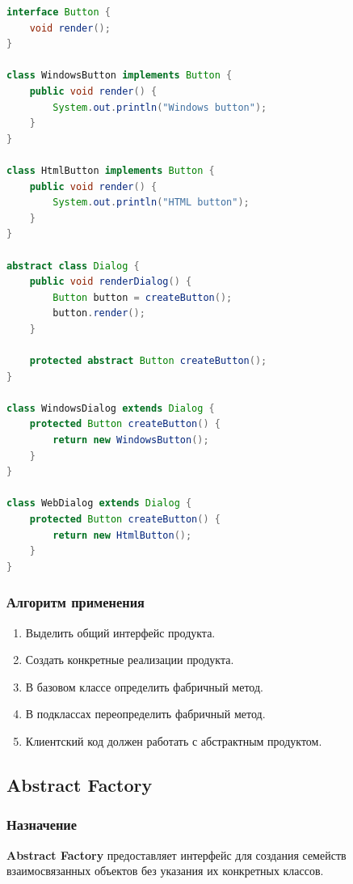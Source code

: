 \documentclass[12pt,a4paper]{article}
\begin{document}
\begin{lstlisting}[language=Java,caption={Factory Method}]
interface Button {
    void render();
}

class WindowsButton implements Button {
    public void render() {
        System.out.println("Windows button");
    }
}

class HtmlButton implements Button {
    public void render() {
        System.out.println("HTML button");
    }
}

abstract class Dialog {
    public void renderDialog() {
        Button button = createButton();
        button.render();
    }

    protected abstract Button createButton();
}

class WindowsDialog extends Dialog {
    protected Button createButton() {
        return new WindowsButton();
    }
}

class WebDialog extends Dialog {
    protected Button createButton() {
        return new HtmlButton();
    }
}
\end{lstlisting}

\subsubsection{Алгоритм применения}

\begin{enumerate}
    \item Выделить общий интерфейс продукта.
    \item Создать конкретные реализации продукта.
    \item В базовом классе определить фабричный метод.
    \item В подклассах переопределить фабричный метод.
    \item Клиентский код должен работать с абстрактным продуктом.
\end{enumerate}

\subsection{Abstract Factory}

\subsubsection{Назначение}

\textbf{Abstract Factory} предоставляет интерфейс для создания семейств взаимосвязанных объектов без указания их конкретных классов.
\end{document}
